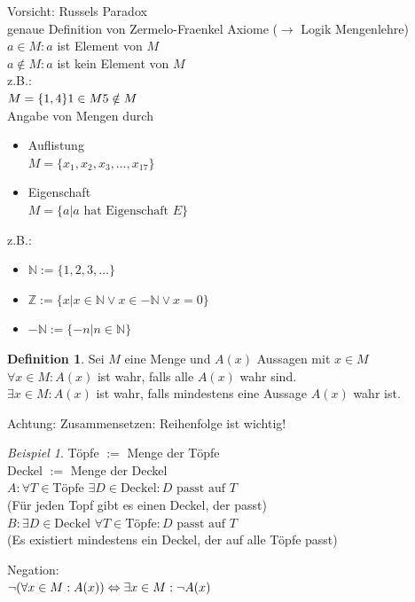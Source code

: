 \documentclass[12pt,a4paper,titlepage]{article} %
\theoremstyle{definition}
\newtheorem{defi}[satz]{Definition}
\theoremstyle{remark}
\newtheorem*{bsp}{Beispiel}
\begin{document}
Vorsicht: Russels Paradox\\
genaue Definition von Zermelo-Fraenkel Axiome ($\rightarrow$ Logik Mengenlehre)\\
$a\in M: a$ ist Element von $M$\\
$a \notin M: a$ ist kein Element von $M$\\
z.B.:\\
$M = \{1, 4\}\\1\in M\\5 \notin M$\\
Angabe von Mengen durch 
\begin{itemize}
	\item Auflistung\\
	$M = \{x_1, x_2, x_3, \dots, x_{17} \}$
	\item Eigenschaft\\
	$M = \{a | a \text{ hat Eigenschaft } E\}$
\end{itemize}
z.B.:
\begin{itemize}
	\item $\mathbb{N} := \{1,2,3,\dots\}$
	\item $\mathbb{Z} := \{x | x \in \mathbb{N} \vee x \in -\mathbb{N} \vee x = 0 \}$
	\item $-\mathbb{N} := \{-n|n\in\mathbb{N}\}$
\end{itemize}
\begin{defi}
	Sei $M$ eine Menge und $A(x)$ Aussagen mit $x\in M$\\
	$\forall x \in M: A(x)$ ist wahr, falls alle $A(x)$ wahr sind.\\
	$\exists x\in M:A(x)$ ist wahr, falls mindestens eine Aussage $A(x)$ wahr ist.
\end{defi}
Achtung: Zusammensetzen: Reihenfolge ist wichtig!
\begin{bsp}
	Töpfe $:=$ Menge der Töpfe\\
	Deckel $:=$ Menge der Deckel\\
	$A: \forall T \in \text{Töpfe } \exists D\in \text{Deckel}: D \text{ passt auf } T$\\(Für jeden Topf gibt es einen Deckel, der passt)\\
	$B: \exists D \in \text{Deckel } \forall T \in \text{Töpfe}: D \text{ passt auf } T$\\(Es existiert mindestens ein Deckel, der auf alle Töpfe passt)
\end{bsp}
Negation:\\
$\neg (\forall x \in M : A(x)) \\ \Leftrightarrow \exists x \in M : \neg A(x)$\\
\end{document}
